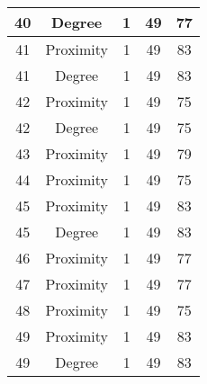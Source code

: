 \documentclass[results.tex]{subfiles}
\begin{document}
\begin{center}
\begin{tabular}{| c || c | c | c | c |}
            \hline
            40                      & Degree                       & 1                      & 49                      & 77                   \\
            \hline
            41                      & Proximity                    & 1                      & 49                      & 83                   \\
            \hline
            41                      & Degree                       & 1                      & 49                      & 83                   \\
            \hline
            42                      & Proximity                    & 1                      & 49                      & 75                   \\
            \hline
            42                      & Degree                       & 1                      & 49                      & 75                   \\
            \hline
            43                      & Proximity                    & 1                      & 49                      & 79                   \\
            \hline
            44                      & Proximity                    & 1                      & 49                      & 75                   \\
            \hline
            45                      & Proximity                    & 1                      & 49                      & 83                   \\
            \hline
            45                      & Degree                       & 1                      & 49                      & 83                   \\
            \hline
            46                      & Proximity                    & 1                      & 49                      & 77                   \\
            \hline
            47                      & Proximity                    & 1                      & 49                      & 77                   \\
            \hline
            48                      & Proximity                    & 1                      & 49                      & 75                   \\
            \hline
            49                      & Proximity                    & 1                      & 49                      & 83                   \\
            \hline
            49                      & Degree                       & 1                      & 49                      & 83                   \\
            \hline
        \end{tabular}
    \end{center}
\end{document}
